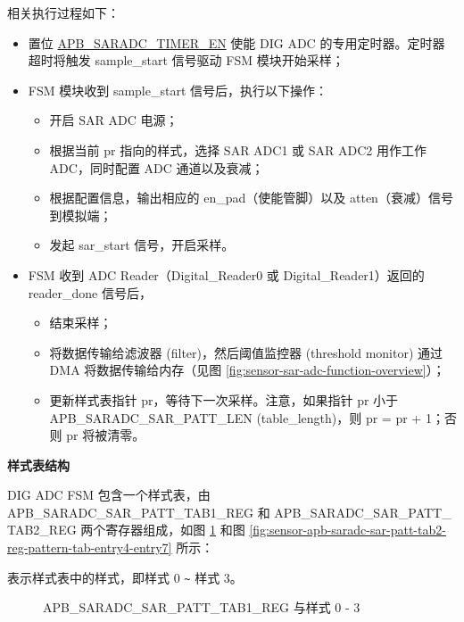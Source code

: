 \documentclass[main\_\_CN.tex]{subfiles}
\begin{document}
相关执行过程如下：
\begin{itemize}
\item 置位 \hyperref[fielddesc:APBSARADCSARADCTIMEREN]{APB\_SARADC\_TIMER\_EN} 使能 DIG ADC 的专用定时器。定时器超时将触发 sample\_start 信号驱动 FSM 模块开始采样；
\item FSM 模块收到 sample\_start 信号后，执行以下操作：
\begin{itemize}
    \item 开启 SAR ADC 电源；
    \item 根据当前 pr 指向的样式，选择 SAR ADC1 或 SAR ADC2 用作工作 ADC，同时配置 ADC 通道以及衰减；
    \item 根据配置信息，输出相应的 en\_pad（使能管脚）以及 atten（衰减）信号到模拟端；
    \item 发起 sar\_start 信号，开启采样。
\end{itemize}

    \item FSM 收到 ADC Reader（Digital\_Reader0 或 Digital\_Reader1）返回的 reader\_done 信号后，
    \begin{itemize}
        \item 结束采样；
        \item 将数据传输给滤波器 (filter)，然后阈值监控器 (threshold monitor) 通过 DMA 将数据传输给内存（见图 \ref{fig:sensor-sar-adc-function-overview}）；
        \item 更新样式表指针 pr，等待下一次采样。注意，如果指针 pr 小于 APB\_SARADC\_SAR\_PATT\_LEN (table\_length)，则 pr = pr + 1；否则 pr 将被清零。
    \end{itemize}
\end{itemize}    
    



\textbf{样式表结构}

DIG ADC FSM 包含一个样式表，由 APB\_SARADC\_SAR\_PATT\_TAB1\_REG 和 APB\_SARADC\_SAR\_PATT\_\\TAB2\_REG 两个寄存器组成，如图 \ref{fig:sensor-apb-saradc-sar-patt-tab1-reg-pattern-tab-entry0-entry3} 和图 \ref{fig:sensor-apb-saradc-sar-patt-tab2-reg-pattern-tab-entry4-entry7} 所示：

%
%
%
%
%
\begin{regdesc}\begin{reglist}
\item [cmd \regindex{x}] 表示样式表中的样式，即样式 0 \verb+~+ 样式 3。
\end{reglist}\end{regdesc}
\vspace{-2em}
\begin{figure}[H]
    \centering
    \caption{APB\_SARADC\_SAR\_PATT\_TAB1\_REG 与样式 0 - 3}
    \label{fig:sensor-apb-saradc-sar-patt-tab1-reg-pattern-tab-entry0-entry3}
\end{figure}
\end{document}
